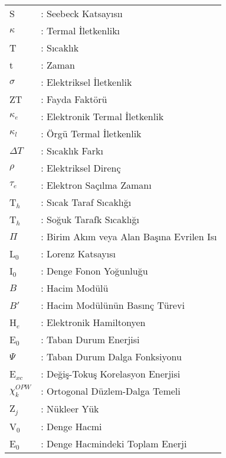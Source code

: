 \hspace{-3mm}
\begin{tabular}{p{2cm}l}
{  {S}} & {  :} Seebeck Katsayısı\i\\
{   $\kappa$} & {  :} Termal İletkenlik\i\\
{   T} & {  :} Sıcaklık\\
{   t} & {  :} Zaman\\
{   $\sigma$} & {  :} Elektriksel İletkenlik\\
{   ZT} & {  :} Fayda Faktörü\\
{   $\kappa_e$} & {  :} Elektronik Termal İletkenlik\\
{   $\kappa_l$} & {  :} Örgü Termal İletkenlik\\
{   $\Delta T$} & {  :} Sıcaklık Farkı\\
{   $\rho$ } & {  :} Elektriksel Direnç\\
{    $\tau_e$} & {  :} Elektron Saçılma Zamanı\\
{    T$_h$} & {  :} Sıcak Taraf Sıcaklığı\\
{    T$_h$} & {  :} Soğuk Tarafk Sıcaklığı\\
{    $\Pi$} & {  :} Birim Akım veya Alan Başına Evrilen Isı\\
{    L$_0$} & {  :} Lorenz Katsayısı\\
{    I$_0$} & {  :} Denge Fonon Yoğunluğu\\
{    $B$} & {  :} Hacim Modülü\\
{    $B'$} & {  :} Hacim Modülünün Basınç Türevi\\
{    H$_e$} & {  :} Elektronik Hamiltonyen\\
{    E$_0$} & {  :} Taban Durum Enerjisi\\
{     $\Psi$} & {  :} Taban Durum Dalga Fonksiyonu\\
{    E$_{xc}$} & {  :} Değiş-Tokuş Korelasyon Enerjisi\\
{    $\chi^{OPW}_k$} & {  :} Ortogonal Düzlem-Dalga Temeli\\ 
{    Z$_j$} & {  :} Nükleer Yük\\ 
{    V$_0$} & {  :} Denge Hacmi\\ 
{    E$_0$} & {  :} Denge Hacmindeki Toplam Enerji\\ 
\end{tabular}
	
